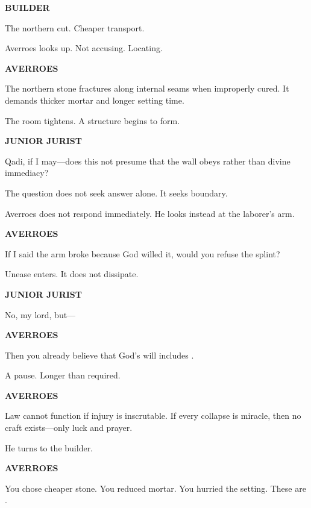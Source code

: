 \textbf{BUILDER}

The northern cut. Cheaper transport.

\medskip

Averroes looks up. Not accusing. Locating.

\medskip

\textbf{AVERROES}

The northern stone fractures along internal seams when improperly cured. It
demands thicker mortar and longer setting time.

\medskip

The room tightens. A structure begins to form.

\medskip

\textbf{JUNIOR JURIST}

Qadi, if I may---does this not presume that the wall obeys 
rather than divine immediacy?

\medskip

The question does not seek answer alone. It seeks boundary.

Averroes does not respond immediately. He looks instead at the laborer's arm.

\medskip

\textbf{AVERROES}

If I said the arm broke because God willed it, would you refuse the splint?

\medskip

Unease enters. It does not dissipate.

\medskip

\textbf{JUNIOR JURIST}

No, my lord, but---

\medskip

\textbf{AVERROES}

Then you already believe that God's will includes .

\medskip

A pause. Longer than required.

\medskip

\textbf{AVERROES}

Law cannot function if injury is inscrutable. If every collapse is miracle,
then no craft exists---only luck and prayer.

\medskip

He turns to the builder.

\medskip

\textbf{AVERROES}

You chose cheaper stone. You reduced mortar. You hurried the setting. These
are .

